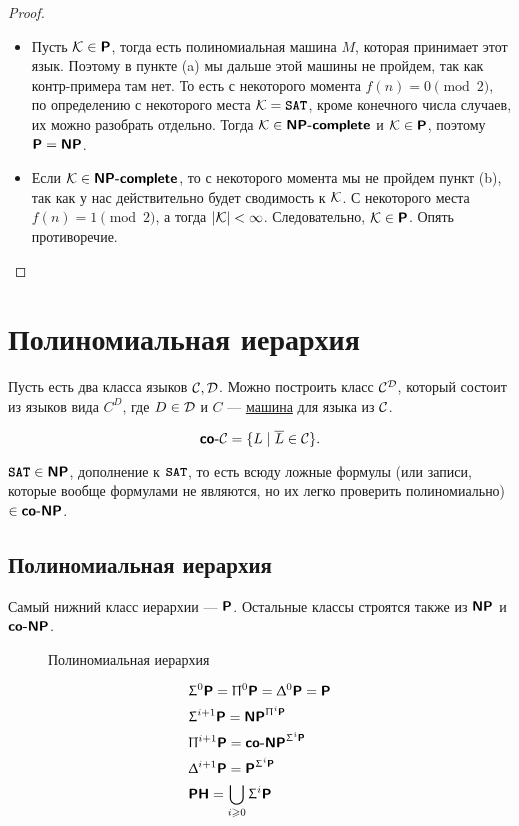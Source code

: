 \begin{proof}
	\begin{itemize}
		\item
	Пусть $ \K \in \P$, тогда  есть полиномиальная машина $ M$, которая принимает этот язык. Поэтому в пункте (a) мы дальше этой машины не пройдем, так как  контр-примера там нет. То есть с некоторого момента $ f(n) = 0 \pmod 2$, по определению с некоторого места   $ \K = \SAT$, кроме конечного числа случаев, их можно разобрать отдельно. 
	Тогда $ \K \in \NPcomp $ и $ \K \in \P$, поэтому $ \P = \NP$.
\item Если $ \K \in \NPcomp$, то с некоторого момента мы не пройдем пункт (b), так как у нас действительно будет сводимость к $ \K$.
	С некоторого места  $ f(n) = 1 \pmod 2$, а тогда  $ \lvert \K \rvert < \infty$. Следовательно, $ \K \in \P$. Опять противоречие. 
	\end{itemize}
\end{proof}

\section{Полиномиальная иерархия}
\begin{name}
Пусть есть два класса языков $ \Cclass, \Dclass$. Можно построить класс $ \Cclass ^{\Dclass}$, который состоит из  языков вида $ C^{D} $, где $ D \in \Dclass$ и $ C$ --- \underline{машина} для языка из $ \Cclass$.
\end{name}
\begin{defn}
    \[
    \coC = \{L \mid \overline{L} \in \Cclass\}
    .\] 
\end{defn}
\begin{ex}
	$ \SAT \in \NP$, дополнение к $ \SAT$, то есть всюду ложные формулы (или записи, которые вообще формулами не являются, но их легко проверить полиномиально) $ \in \coNP$.
\end{ex}

\subsection{Полиномиальная иерархия}
Самый нижний класс иерархии --- $ \P$. Остальные классы строятся также из  $ \NP$ и $ \coNP$.
\begin{figure}[b!]
    \centering
    \caption{Полиномиальная иерархия}
    \label{fig:hierarchy}
\end{figure}
\[
\begin{aligned}
	&\SIGMA ^{0}\P = \PI ^{0}\P = \DELTA ^{0} \P = \P \\
	& \SIGMA ^{i+1} \P = \NP^{\PI^{i}\P} \\
	& \PI^{i+1}\P = \coNP^{\SIGMA ^{i}\P}\\
	& \DELTA ^{i+1}\P = \P^{\SIGMA ^{i}\P} \\
	& \PH = \bigcup_{i \ge 0} \SIGMA ^{i} \P
\end{aligned}\index{\PH}\index{$ \SIGMA^{i}\P$}\index{$ \PI^i\P$ }\index{$ \Delta ^{i}\P$ }
\]

